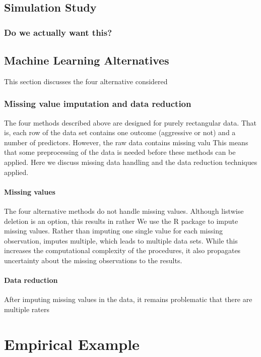 \documentclass[a4paper,11pt]{article}
\begin{document}
\subsection{Simulation Study}

\subsubsection{Do we actually want this?}

\subsection{Machine Learning Alternatives}
This section discusses the four alternative considered
\subsubsection{Missing value imputation and data reduction}
The four methods described above are designed for purely rectangular data.
That is, each row of the data set contains one outcome (aggressive or not) and a number of predictors.
However, the raw data contains missing valu
This means that some preprocessing of the data is needed before these methods can be applied.
Here we discuss missing data handling and the data reduction techniques applied.

\paragraph{Missing values}
The four alternative methods do not handle missing values.
Although listwise deletion is an option, this results in rather 
We use the R package  \parencite{vanBuuren2011mice} to impute missing values.
Rather than imputing one single value for each missing observation,  imputes multiple, which leads to multiple data sets.
While this increases the computational complexity of the procedures, it also propagates uncertainty about the missing observations to the results.


\paragraph{Data reduction}
After imputing missing values in the data, it remains problematic that there are multiple raters


\section{Empirical Example}
\end{document}
